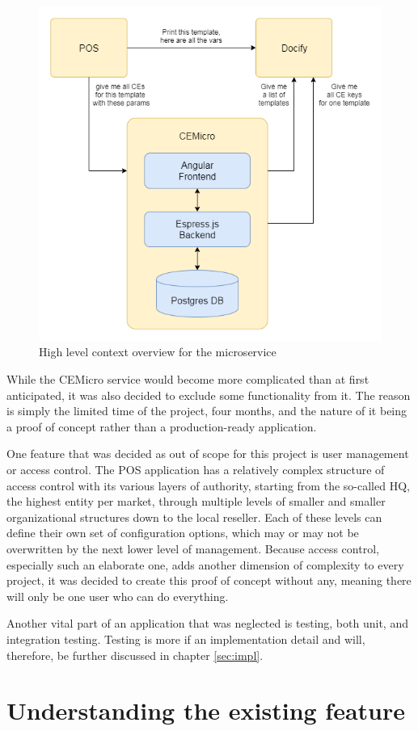 \begin{figure}
  \centering
  \includegraphics[width=0.6\linewidth]{assets/high-level-overview.png}
  \caption{High level context overview for the microservice}
  \label{fig:context}
\end{figure}

While the CEMicro service would become more complicated than at first anticipated, it was also decided to exclude some functionality from it. The reason is simply the limited time of the project, four months, and the nature of it being a proof of concept rather than a production-ready application.

One feature that was decided as out of scope for this project is user management or access control. The POS application has a relatively complex structure of access control with its various layers of authority, starting from the so-called HQ, the highest entity per market, through multiple levels of smaller and smaller organizational structures down to the local reseller. Each of these levels can define their own set of configuration options, which may or may not be overwritten by the next lower level of management. Because access control, especially such an elaborate one, adds another dimension of complexity to every project, it was decided to create this proof of concept without any, meaning there will only be one user who can do everything.

Another vital part of an application that was neglected is testing, both unit, and integration testing. Testing is more if an implementation detail and will, therefore, be further discussed in chapter \ref{sec:impl}.


\section{Understanding the existing feature}

